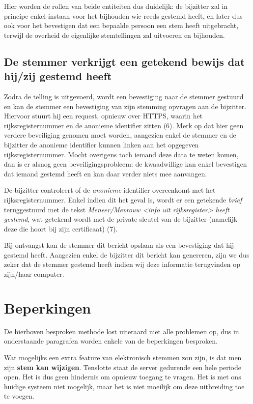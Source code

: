 \documentclass[a4paper,12pt]{article}
\begin{document}
Hier worden de rollen van beide entiteiten dus duidelijk: de bijzitter zal in
principe enkel instaan voor het bijhouden wie reeds gestemd heeft, en later dus
ook voor het bevestigen dat een bepaalde persoon een stem heeft uitgebracht,
terwijl de overheid de eigenlijke stemtellingen zal uitvoeren en bijhouden.

\subsection{De stemmer verkrijgt een getekend bewijs dat hij/zij gestemd heeft}

Zodra de telling is uitgevoerd, wordt een bevestiging naar de stemmer
gestuurd en kan de stemmer een bevestiging van zijn stemming opvragen aan de
bijzitter. Hiervoor stuurt hij een request, opnieuw over HTTPS, waarin het
rijksregisternummer en de anonieme identifier zitten (6). Merk op dat hier
geen verdere beveiliging genomen moet worden, aangezien enkel de stemmer
en de bijzitter de anonieme identifier kunnen linken aan het opgegeven
rijksregisternummer. Mocht overigens toch iemand deze data te weten komen, dan
is er alsnog geen beveiligingsprobleem: de kwaadwillige kan enkel bevestigen dat
iemand gestemd heeft en kan daar verder niets mee aanvangen.

De bijzitter controleert of de \emph{anonieme} identifier overeenkomt met het
rijksregisternummer. Enkel indien dit het geval is, wordt er een getekende
\emph{brief} teruggestuurd met de tekst \emph{Meneer/Mevrouw <info uit
rijksregister> heeft gestemd}, wat getekend wordt met de private sleutel van de
bijzitter (namelijk deze die hoort bij zijn certificaat) (7).

Bij ontvangst kan de stemmer dit bericht opslaan als een bevestiging dat hij
gestemd heeft. Aangezien enkel de bijzitter dit bericht kan genereren, zijn we
dus zeker dat de stemmer gestemd heeft indien wij deze informatie terugvinden op
zijn/haar computer.

\section{Beperkingen}

De hierboven besproken methode lost uiteraard niet alle problemen op, dus in
onderstaande paragrafen worden enkele van de beperkingen besproken.


Wat mogelijks een extra feature van elektronisch stemmen zou zijn, is dat men
zijn \textbf{stem kan wijzigen}. Tenslotte staat de server gedurende een hele
periode open. Het is dus geen hindernis om opnieuw toegang te vragen. Het is met
ons huidige systeem niet mogelijk, maar het is niet moeilijk om deze
uitbreiding toe te voegen.
\end{document}
